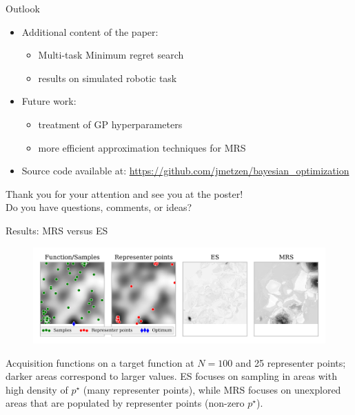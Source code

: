 \documentclass[11pt]{beamer}
\begin{document}
\begin{frame}{Outlook}
  
  \begin{itemize}
    \item Additional content of the paper:
    \begin{itemize}
      \item Multi-task Minimum regret search
      \item results on simulated robotic task
    \end{itemize}
    \pause
    \item Future work:
    \begin{itemize}
      \item treatment of GP hyperparameters
      \item more efficient approximation techniques for MRS
    \end{itemize}
    \pause
    \item Source code available at: \url{https://github.com/jmetzen/bayesian_optimization}
  \end{itemize}

  \vspace*{1.5cm}
  \pause
  \begin{center}
   Thank you for your attention and see you at the poster! \\
   Do you have questions, comments, or ideas?
   \end{center}

\end{frame}

\begin{frame}{Results: MRS versus ES}
\begin{figure}
\centering
\includegraphics[width=.8\textwidth]{../pics/es_analysis}
\label{fig:es_analysis}
\end{figure}

Acquisition functions on a target function at $N=100$ and 25 representer points; darker areas correspond to larger values. ES focuses on sampling in areas with high density of $p^\star$ (many representer points), while MRS focuses on unexplored areas that are populated by representer points (non-zero $p^\star$).

\end{frame}
\end{document}
